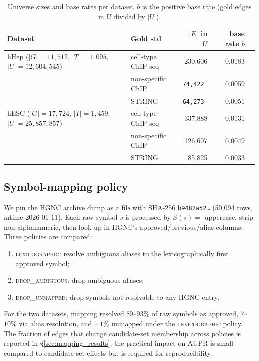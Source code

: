 \documentclass[sigconf]{acmart}
\begin{document}
\begin{table}[t]
\caption{Universe sizes and base rates per dataset. $b$ is the positive
base rate (gold edges in $U$ divided by $|U|$).}
\label{tab:universe}
\small
\begin{tabular}{llrrr}
\toprule
Dataset & Gold std & $|E|$ in $U$ & base rate $b$ \\
\midrule
hHep ($|G|=11{,}512$, $|T|=1{,}095$, $|U|=12{,}604{,}545$) & cell-type ChIP-seq & 230{,}606 & 0.0183 \\
                                                          & non-specific ChIP & \tt 74{,}422 & 0.0059 \\
                                                          & STRING & \tt 64{,}273 & 0.0051 \\
hESC ($|G|=17{,}724$, $|T|=1{,}459$, $|U|=25{,}857{,}857$) & cell-type ChIP-seq & 337{,}888 & 0.0131 \\
                                                          & non-specific ChIP & 126{,}607 & 0.0049 \\
                                                          & STRING & 85{,}825 & 0.0033 \\
\bottomrule
\end{tabular}
\end{table}

\subsection{Symbol-mapping policy}
\label{sec:mapping}

We pin the HGNC archive dump as a file with SHA-256
\texttt{b9482a52\ldots} (50{,}094 rows, mtime 2026-01-11). Each raw symbol $s$ is
processed by $\mathcal{S}(s) = $ uppercase, strip non-alphanumeric, then
look up in HGNC's approved/previous/alias columns. Three policies are
compared:
\begin{enumerate}
\item \textsc{lexicographic}: resolve ambiguous aliases to the
lexicographically first approved symbol;
\item \textsc{drop\_ambiguous}: drop ambiguous aliases;
\item \textsc{drop\_unmapped}: drop symbols not resolvable to any
HGNC entry.
\end{enumerate}
For the two datasets, mapping resolved $89$--$93\%$ of raw
symbols as approved, $7$--$10\%$ via alias resolution, and $\sim1\%$
unmapped under the \textsc{lexicographic} policy. The fraction of edges
that change candidate-set membership across policies is reported in
\S\ref{sec:mapping_results}; the practical impact on AUPR is small
compared to candidate-set effects but is required for reproducibility.
\end{document}

